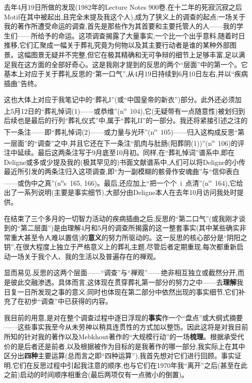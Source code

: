 去年4月19日所做的发现(1982年的Lecture Notes 900卷,在十二年的死寂沉寂之后Motif在其中被起出,且完全未提及我这个人),成为了狭义上的调查的起点:一场关于我的著作所遭受命运的调查,首先是那些作为其首要和主要托管人的人——我的学生们——所给予的命运。这项调查揭露了大量事实,一个比一个出乎意料,随着时日推移,它们汇聚成一幅关于葬礼究竟为何物以及其主要行动者是谁的某种外部图景。这幅图景无疑并不完整,但它在极其精确和无可争辩的细节上足够丰富,足以满足我在这方面的全部好奇心。这是我刚才提到的反思的两个“层面”中的第一个。它基本上对应于关于葬礼反思的“第一口气”,从4月19日持续到6月10日左右,并以“疾病插曲”告终。

这也大体上对应于我笔记中的“葬礼I”(或“中国皇帝的新衣”)部分。此外还必须加上5月12日的“葬礼悼词(1)——或恭维”(n\textsuperscript{o}~104),它(无疑带有一点随意性)被划归到后续也是最后的行列“葬礼仪式”中,属于“葬礼II”的一部分。我还将紧接引述之注的下一条注——即“葬礼悼词(2)——或力量与光环”(n\textsuperscript{o}~105)\dmark{}——归入这构成反思“第一层面”的“调查”之中,并且它还在下一条注“肌肉与肚肠(阳葬阴(1))”(n\textsuperscript{o}~106)的评注中延续。最后这两条注写于9月底至10月初。同样,在“葬礼悼词”谱系中,即在Deligne或多或少提及我的(极其罕见的)书面文献谱系中,人们可以将Deligne的小传最近所引发的两条注归入这项调查,即“为一副模糊的骸骨作安魂曲”与“信仰表白——或伪中之真”(n\textsuperscript{o}s~165, 166)。最后,还应加上“把一个个~i~点清”(n\textsuperscript{o}~164),它给出了一系列说明(主要是事实细节),大部分由Deligne本人在去年10月访问我处时提供。

在结束了三个多月的一切智力活动的疾病插曲之后,反思的“第二口气”(或我刚才谈到的“第二层面”)是由理解4月和5月的调查所揭露的这一整套事实(其中某些确实非常重大甚至令人难以置信)的\textbf{意义}的努力所驱动的。这一反思的核心部分是“阴阳之钥”,在很大程度上独立于严格意义上的葬礼主题,尽管后者定期重现,每次都重新启动一场关于我个人、我的生活以及普遍存在的禅观。

显而易见,反思的这两个层面——“调查”与“禅观”——绝非相互独立或截然分开,而是彼此交融渗透。具体而言,这体现在贯穿葬礼第一部分的努力之中——去\textbf{理解}我日复一日所发现之事的意义;同时也体现在第二部分中依然出现的事实细节,它们补充了在初步“调查”中已获得的内容。

我目前的用意,是对在整个调查过程中逐日浮现的\textbf{事实}\dmark{}作一个“盘点”或大纲式摘要——这些事实我至今从未劳神以稍具连贯性的方式加以整饬。因此这将是对我目前所知的针对我的著作以及Mebkhout著作的“大规模行动”的一场\textbf{梳理}。根据承受代价的是后者还是前者,以及根据被作为目标的是我著作的哪一部分,我实际上在其中区分出\textbf{四种}主要运算(总而言之即“四种运算”),我首先想对它们进行回顾。事实证明,它们在反思过程中引起我注意的顺序,也与它们在1970年我“离开”之后(甚至在此之前)启动的时间顺序相重合(最后两项仅有一点微小的倒置)。

